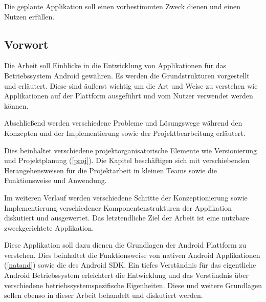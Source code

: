 Die geplante Applikation soll einen vorbestimmten Zweck dienen und einen Nutzen erfüllen.

\subsection{Vorwort}
Die Arbeit soll Einblicke in die Entwicklung von Applikationen für das Betriebssystem Android gewähren. Es werden die Grundstrukturen vorgestellt und erläutert. Diese sind äußerst wichtig um die Art und Weise zu verstehen wie Applikationen auf der Plattform ausgeführt und vom Nutzer verwendet werden können.

Abschließend werden verschiedene Probleme und Lösungswege während den Konzepten und der Implementierung sowie der Projektbearbeitung erläutert.

Dies beinhaltet verschiedene projektorganisatorische Elemente wie Versionierung und Projektplanung (\ref{proj}). Die Kapitel beschäftigen sich mit verschiebenden Herangehensweisen für die Projektarbeit in kleinen Teams sowie die Funktionsweise und Anwendung.

Im weiteren Verlauf werden verschiedene Schritte der Konzeptionierung sowie Implementierung verschiedener Komponentenstrukturen der Applikation diskutiert und ausgewertet. Das letztendliche Ziel der Arbeit ist eine nutzbare zweckgerichtete Applikation.

Diese Applikation soll dazu dienen die Grundlagen der Android Plattform zu verstehen. Dies beinhaltet die Funktionsweise von nativen Android Applikationen (\ref{natand}) sowie die des Android SDK. Ein tiefes Verständnis für das eigentliche Android Betriebssystem erleichtert die Entwicklung und das Verständnis über verschiedene betriebssystemspezifische Eigenheiten. Diese und weitere Grundlagen sollen ebenso in dieser Arbeit behandelt und diskutiert werden.
